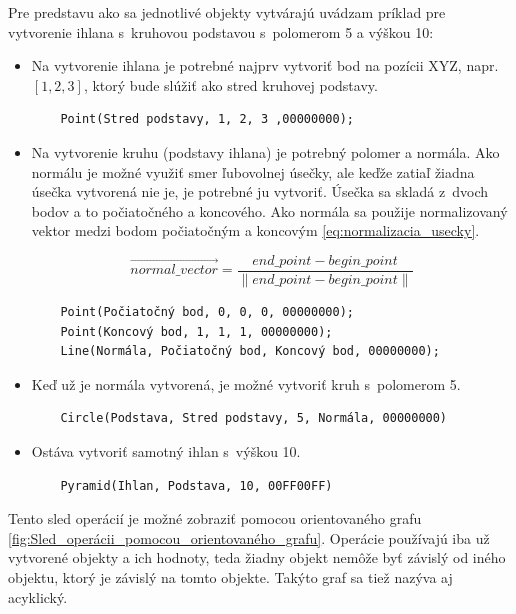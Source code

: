 Pre predstavu ako sa jednotlivé objekty vytvárajú uvádzam príklad pre vytvorenie ihlana s~kruhovou podstavou s~polomerom 5 a výškou 10:
\begin{itemize}
    \item Na vytvorenie ihlana je potrebné najprv vytvoriť bod na pozícii XYZ, napr. $\left [ 1, 2, 3 \right ]$, ktorý bude slúžiť ako stred kruhovej podstavy.
	\begin{lstlisting}
	Point(Stred podstavy, 1, 2, 3 ,00000000);
	\end{lstlisting}
	\item Na vytvorenie kruhu (podstavy ihlana) je potrebný polomer a normála. Ako normálu je možné využiť smer ľubovolnej úsečky, ale keďže zatiaľ žiadna úsečka vytvorená nie je, je potrebné ju vytvoriť. Úsečka sa skladá z~dvoch bodov a to počiatočného a koncového. Ako normála sa použije normalizovaný vektor medzi bodom počiatočným a koncovým \ref{eq:normalizacia_usecky}.

	\begin{equation}
		\overrightarrow{normal\_vector}=
		\frac{end\_point - begin\_point}{
		\left \|  end\_point - begin\_point \right \|}
	\label{eq:normalizacia_usecky}
	\end{equation}

	\begin{lstlisting}
	Point(Počiatočný bod, 0, 0, 0, 00000000);
	Point(Koncový bod, 1, 1, 1, 00000000);
	Line(Normála, Počiatočný bod, Koncový bod, 00000000);
	\end{lstlisting}
	\item Keď už je normála vytvorená, je možné vytvoriť kruh s~polomerom 5.
	\begin{lstlisting}
	Circle(Podstava, Stred podstavy, 5, Normála, 00000000) 
	\end{lstlisting}
	\item Ostáva vytvoriť samotný ihlan s~výškou 10.
	\begin{lstlisting}
	Pyramid(Ihlan, Podstava, 10, 00FF00FF)
	\end{lstlisting}
\end{itemize}


Tento sled operácií je možné zobraziť pomocou orientovaného grafu \ref{fig:Sled_operácii_pomocou_orientovaného_grafu}. 
Operácie používajú iba už vytvorené objekty a ich hodnoty, teda žiadny objekt nemôže byť závislý od iného objektu, ktorý je závislý na tomto objekte. Takýto graf sa tiež nazýva aj acyklický. 


